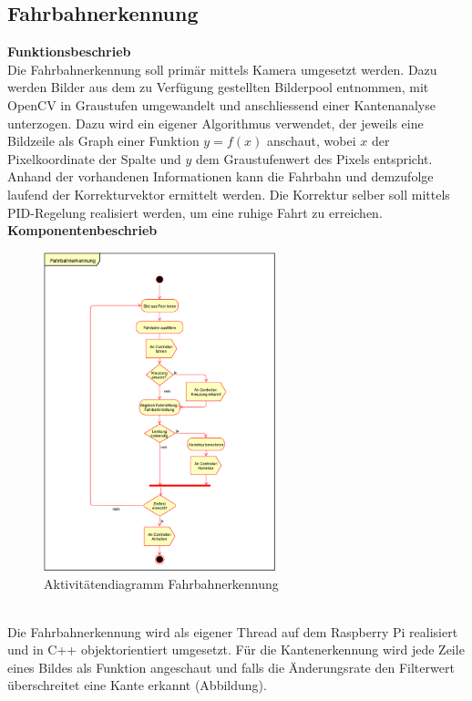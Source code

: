 \subsection{Fahrbahnerkennung}
\textbf{Funktionsbeschrieb}\\
Die Fahrbahnerkennung soll primär mittels Kamera umgesetzt werden. Dazu werden Bilder aus dem zu Verfügung gestellten Bilderpool entnommen, mit OpenCV in Graustufen umgewandelt und anschliessend einer Kantenanalyse unterzogen. Dazu wird ein eigener Algorithmus verwendet, der jeweils eine Bildzeile als Graph einer Funktion $y = f(x)$ anschaut, wobei $x$ der Pixelkoordinate der Spalte und $y$ dem Graustufenwert des Pixels entspricht.\\
Anhand der vorhandenen Informationen kann die Fahrbahn und demzufolge laufend der Korrekturvektor ermittelt werden. Die Korrektur selber soll mittels PID-Regelung realisiert werden, um eine ruhige Fahrt zu erreichen.\\
\textbf{Komponentenbeschrieb}
\begin{figure}[h!]%
\centering
\includegraphics[width=0.6\textwidth]{03_Loesungskonzept/pictures/Fahrbahnerkennung.png}
\caption{Aktivitätendiagramm Fahrbahnerkennung}
\label{fig:activityRoute}
\end{figure}\\
Die Fahrbahnerkennung wird als eigener Thread auf dem Raspberry Pi realisiert und in C++ objektorientiert umgesetzt. Für die Kantenerkennung wird jede Zeile eines Bildes als Funktion angeschaut und falls die Änderungsrate den Filterwert überschreitet eine Kante erkannt (Abbildung). \\
